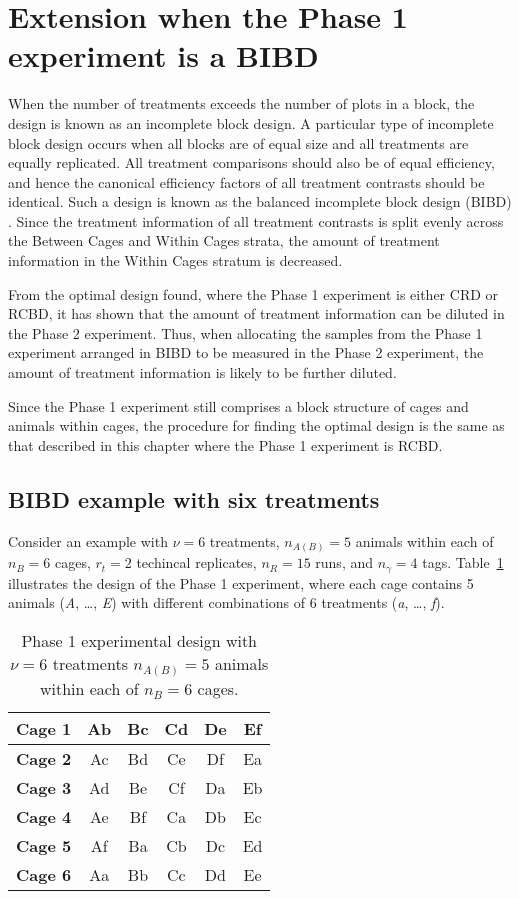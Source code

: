 \section{Extension when the Phase 1 experiment is a BIBD}
\label{sec:extBIBD}
When the number of treatments exceeds the number of plots in a block, the design is known as an incomplete block design. A particular type of incomplete block design occurs when all blocks are of equal size and all treatments are equally replicated. All treatment comparisons should also be of equal efficiency, and hence the canonical efficiency factors of all treatment contrasts should be identical. Such a design is known as the balanced incomplete block design (BIBD) \citep{John1987}. Since the treatment information of all treatment contrasts is split evenly across the Between Cages and Within Cages strata, the amount of treatment information in the Within Cages stratum is decreased.

From the optimal design found, where the Phase 1 experiment is either CRD or RCBD, it has shown that the amount of treatment information can be diluted in the Phase 2 experiment. Thus, when allocating the samples from the Phase 1 experiment arranged in BIBD to be measured in the Phase 2 experiment, the amount of treatment information is likely to be further diluted. 

Since the Phase 1 experiment still comprises a block structure of cages and animals within cages, the procedure for finding the optimal design is the same as that described in this chapter where the Phase 1 experiment is RCBD. 

\subsection{BIBD example with six treatments}
\label{sec:exp6TrtBIBD}
Consider an example with $\nu = 6$ treatments, $n_{A(B)} = 5$ animals within each of $n_B = 6$ cages, $r_t = 2$ techincal replicates, $n_R = 15$ runs, and $n_\gamma = 4$ tags. Table~\ref{tab:Phase1DesBIBD} illustrates the design of the Phase 1 experiment, where each cage contains 5 animals (\textit{A}, \dots, \textit{E}) with different combinations of 6 treatments (\textit{a}, \dots, \textit{f}). 

\begin{table}[ht]
\centering
\itshape
\caption{Phase 1 experimental design with $\nu = 6$ treatments $n_{A(B)} = 5$ animals within each of $n_B = 6$ cages.}
\begin{tabular}[t]{|c|ccccc|} \hline
{\bf Cage 1} & Ab & Bc & Cd & De & Ef   \\ \hline
{\bf Cage 2} & Ac & Bd & Ce & Df & Ea  \\  \hline
{\bf Cage 3} & Ad & Be & Cf & Da & Eb  \\  \hline
{\bf Cage 4} & Ae & Bf & Ca & Db & Ec  \\  \hline
{\bf Cage 5} & Af & Ba & Cb & Dc & Ed  \\  \hline
{\bf Cage 6} & Aa & Bb & Cc & Dd & Ee  \\  \hline
\end{tabular} 
\label{tab:Phase1DesBIBD}
\end{table}

